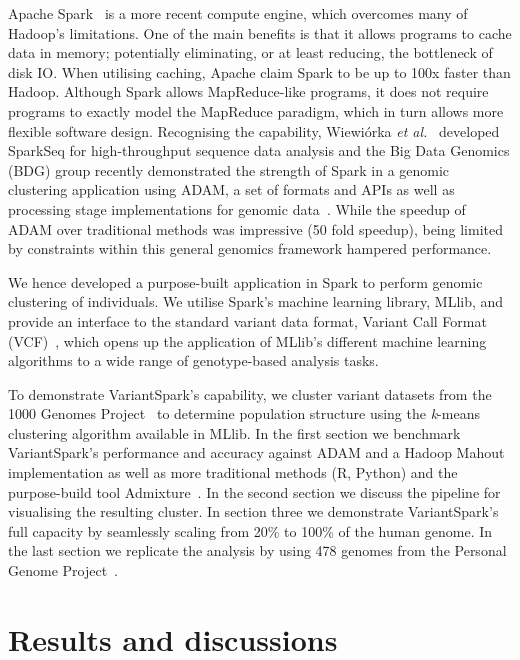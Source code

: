 \documentclass{bmcart}
\newcommand{\variantSpark}{{\sc VariantSpark}}
\newcommand{\kMeans}{\textit{k}-means}
\begin{document}
{\sc Apache Spark}~\cite{Zaharia2011} is a more recent compute engine, which overcomes many of Hadoop's limitations. 
One of the main benefits is that it allows programs to cache data in memory; potentially eliminating, or at least reducing, the bottleneck of disk IO. 
When utilising caching, Apache claim {\sc Spark} to be up to 100x faster than Hadoop. 
Although {\sc Spark} allows MapReduce-like programs, it does not require programs to exactly model the MapReduce paradigm, which in turn allows more flexible software design. 
Recognising the capability, Wiewi{\'o}rka {\it et al.}~\cite{Wiewiorka2014} developed SparkSeq for high-throughput sequence data analysis and the Big Data Genomics (BDG) group recently demonstrated the strength of {\sc Spark} in a genomic clustering application using {\sc ADAM}, a set of formats and APIs as well as processing stage implementations for genomic data~\cite{Massie2013}. 
While the speedup of {\sc ADAM} over traditional methods was impressive (50 fold speedup), being limited by constraints within this general genomics framework hampered performance. 

We hence developed a purpose-built application in {\sc Spark} to perform genomic clustering of individuals. 
We utilise {\sc Spark}'s machine learning library, \mbox{MLlib}, and provide an interface to the standard variant data format, Variant Call Format (VCF)~\cite{1KG2012}, which opens up the application of MLlib's different machine learning algorithms to a wide range of genotype-based analysis tasks. 

To demonstrate \variantSpark's capability, we cluster variant datasets from the 1000 Genomes Project~\cite{1KG2012} to determine population structure using the \kMeans{} clustering algorithm available in MLlib. 
In the first section we benchmark \variantSpark's performance and accuracy against {\sc ADAM} and a Hadoop Mahout implementation as well as more traditional methods (R, Python) and the purpose-build tool {\sc Admixture}~\cite{Alexander2009}. %
In the second section we discuss the pipeline for visualising the resulting cluster.
In section three we demonstrate \variantSpark's full capacity by seamlessly scaling from 20\% to 100\% of the human genome.
In the last section we replicate the analysis by using 478 genomes from the Personal Genome Project~\cite{Lunshof2013}.


\section*{Results and discussions}
\end{document}
